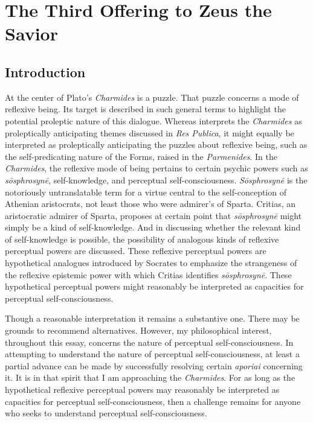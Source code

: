 \chapter{The Third Offering to Zeus the Savior} %
\label{cha:offering}

\section{Introduction} %
\label{sec:introduction}

At the center of Plato's \emph{Charmides} is a puzzle. That puzzle concerns a mode of reflexive being. Its target is described in such general terms to highlight the potential proleptic nature of this dialogue. Whereas \citet{Kahn:1988aa} interprets the \emph{Charmides} as proleptically anticipating themes discussed in \emph{Res Publica}, it might equally be interpreted as proleptically anticipating the puzzles about reflexive being, such as the self-predicating nature of the Forms, raised in the \emph{Parmenides}. In the \emph{Charmides}, the reflexive mode of being pertains to certain psychic powers such as \emph{sōsphrosynē}, self-knowledge, and perceptual self-consciousness. \emph{Sōsphrosynē} is the notoriously untranslatable term for a virtue central to the self-conception of Athenian aristocrats, not least those who were admirer's of Sparta. Critias, an aristocratic admirer of Sparta, proposes at certain point that \emph{sōsphrosynē} might simply be a kind of self-knowledge. And in discussing whether the relevant kind of self-knowledge is possible, the possibility of analogous kinds of reflexive perceptual powers are discussed. These reflexive perceptual powers are hypothetical analogues introduced by Socrates to emphasize the strangeness of the reflexive epistemic power with which Critias identifies \emph{sōsphrosynē}. These hypothetical perceptual powers might reasonably be interpreted as capacities for perceptual self-consciousness. 

Though a reasonable interpretation it remains a substantive one. There may be grounds to recommend alternatives. However, my philosophical interest, throughout this essay, concerns the nature of perceptual self-consciousness. In attempting to understand the nature of perceptual self-consciousness, at least a partial advance can be made by successfully resolving certain \emph{aporiai} concerning it. It is in that spirit that I am approaching the \emph{Charmides}. For as long as the hypothetical reflexive perceptual powers may reasonably be interpreted as capacities for perceptual self-consciousness, then a challenge remains for anyone who seeks to understand perceptual self-consciousness.

